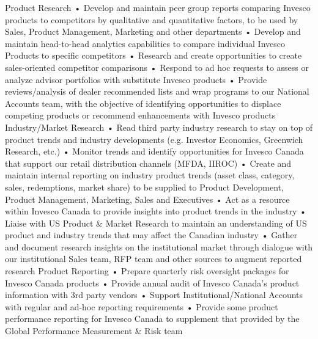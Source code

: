 \documentclass[footinclude, headinclude, letterpaper]{scrartcl}
\begin{document}
\begin{cv}{}
\begin{mycomments}
 Product Research
•	Develop and maintain peer group reports comparing Invesco products to competitors by qualitative and quantitative factors, to be used by Sales, Product Management, Marketing and other departments
•	Develop and maintain head-to-head analytics capabilities to compare individual Invesco Products to specific competitors
•	Research and create opportunities to create sales-oriented competitor comparisons
•	Respond to ad hoc requests to assess or analyze advisor portfolios with substitute Invesco products
•	Provide reviews/analysis of dealer recommended lists and wrap programs to our National Accounts team, with the objective of identifying opportunities to displace competing products or recommend enhancements with Invesco products
Industry/Market Research
•	Read third party industry research to stay on top of product trends and industry developments (e.g. Investor Economics, Greenwich Research, etc.)
•	Monitor trends and identify opportunities for Invesco Canada that support our retail  distribution channels (MFDA, IIROC)
•	Create and maintain internal reporting on industry product trends (asset class, category, sales, redemptions, market share) to be supplied to Product Development, Product Management, Marketing, Sales and Executives
•	Act as a resource within Invesco Canada to provide insights into product trends in the industry
•	Liaise with US Product & Market Research to maintain an understanding of US product and industry trends that may affect the Canadian industry
•	Gather and document research insights on the institutional market through dialogue with our institutional Sales team, RFP team and other sources to augment reported research
Product Reporting 
•	Prepare quarterly risk oversight packages for Invesco Canada products
•	Provide annual audit of Invesco Canada’s product information with 3rd party vendors
•	Support Institutional/National Accounts with regular and ad-hoc reporting requirements
•	Provide some product performance reporting for Invesco Canada to supplement that provided by the Global Performance Measurement & Risk team
\end{mycomments}



\end{cv}
\end{document}
